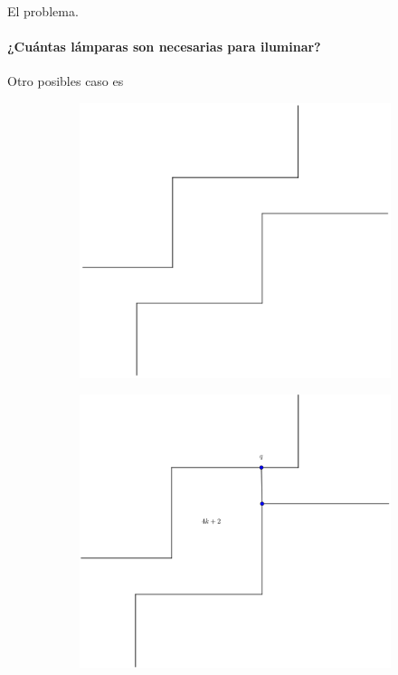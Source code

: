 \begin{frame}{El problema.} %
  \framesubtitle{¿Cuántas lámparas son necesarias para iluminar?} %
  Otro posibles caso es
  \begin{figure}
    \centering
    \begin{subfigure}[b]{0.25\paperwidth}
      \includegraphics[width=.3 \paperwidth]{./images/Ejemplar.png}
    \end{subfigure}
    \begin{subfigure}[b]{0.25\paperwidth}
      \includegraphics[width=.3 \paperwidth]{./images/EjemplarC2.png}

\end{subfigure}
\end{figure}
\end{frame}
